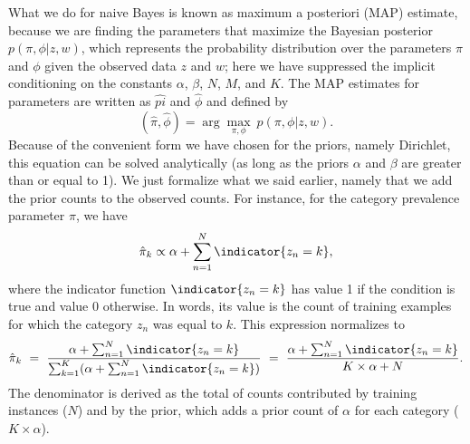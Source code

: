 What we do for naive Bayes is known as maximum a posteriori (MAP)
estimate, because we are finding the parameters that maximize the
Bayesian posterior $p(\pi,\phi|z,w)$, which represents the probability
distribution over the parameters $\pi$ and $\phi$ given the observed
data $z$ and $w$; here we have suppressed the implicit conditioning on
the constants $\alpha$, $\beta$, $N$, $M$, and $K$.  The MAP estimates
for parameters are written as $\hat{pi}$ and $\hat{\phi}$ and defined
by 
%
\begin{equation}
(\hat{\pi},\hat{\phi})
= \arg\max_{\pi,\phi} \ p(\pi,\phi|z,w).
\end{equation}  
%
Because of the convenient form we have chosen for the priors, namely
Dirichlet, this equation can be solved analytically (as long as the
priors $\alpha$ and $\beta$ are greater than or equal to 1).
We just formalize what we said earlier, namely that we add the prior
counts to the observed counts.  For instance, for the category prevalence
parameter $\pi$, we have
%
\begin{equation}
\hat{\pi}_k \propto \alpha + \sum_{n=1}^N \indicator{z_n = k},
\end{equation}
%
where the indicator function $\indicator{z_n = k}$ has value 1 if the
condition is true and value 0 otherwise.  In words, its value is the
count of training examples for which the category $z_n$ was equal to
$k$.  This expression normalizes to
%
\begin{equation}
\hat{\pi}_k 
\ = \ \frac{\alpha + \sum_{n=1}^N \indicator{z_n = k}}
       {\sum_{k=1}^K (\alpha + \sum_{n=1}^N \indicator{z_n = k})}
\ = \ \frac{\alpha + \sum_{n=1}^N \indicator{z_n = k}}
       {K \times \alpha + N}.          
\end{equation}
%
The denominator is derived as the total of counts contributed by
training instances ($N$) and by the prior, which adds a prior count of
$\alpha$ for each category ($K \times \alpha$).














